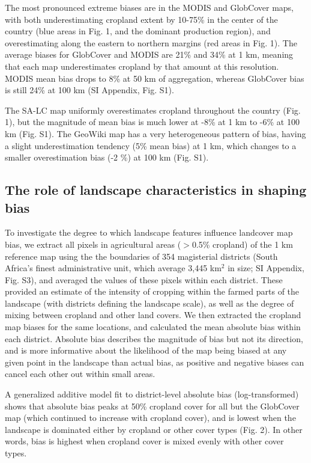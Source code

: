 \documentclass{pnastwo}
\begin{document}
\begin{article}
The most pronounced extreme biases are in the MODIS and GlobCover maps, with both underestimating cropland extent by 10-75\% in the center of the country (blue areas in Fig. 1, and the dominant production region), and overestimating along the eastern to northern margins (red areas in Fig. 1). The average biases for GlobCover and MODIS are 21\% and 34\% at 1 km, meaning that each map underestimates cropland by that amount at this resolution. MODIS mean bias drops to 8\% at 50 km of aggregation, whereas GlobCover bias is still 24\% at 100 km (SI Appendix, Fig. S1). 

The SA-LC map uniformly overestimates cropland throughout the country (Fig. 1), but the magnitude of mean bias is much lower at -8\% at 1 km to -6\% at 100 km  (Fig. S1). The GeoWiki map has a very heterogeneous pattern of bias, having a slight underestimation tendency (5\% mean bias) at 1 km, which changes to a smaller overestimation bias (-2 \%) at 100 km (Fig. S1).    

\subsection{The role of landscape characteristics in shaping bias}
To investigate the degree to which landscape features influence landcover map bias, we extract all pixels in agricultural areas ($>$0.5\% cropland) of the 1 km reference map using the the boundaries of 354 magisterial districts (South Africa's finest administrative unit, which average 3,445 km$^2$ in size; SI Appendix, Fig. S3), and averaged the values of these pixels within each district. These provided an estimate of the intensity of cropping within the farmed parts of the landscape (with districts defining the landscape scale), as well as the degree of mixing between cropland and other land covers. We then extracted the cropland map biases for the same locations, and calculated the mean absolute bias within each district. Absolute bias describes the magnitude of bias but not its direction, and is more informative about the likelihood of the map being biased at any given point in the landscape than actual bias, as positive and negative biases can cancel each other out within small areas. 

A generalized additive model fit to district-level absolute bias (log-transformed) shows that absolute bias peaks at 50\% cropland cover for all but the GlobCover map (which continued to increase with cropland cover), and is lowest when the landscape is dominated either by cropland or other cover types (Fig. 2). In other words, bias is highest when cropland cover is mixed evenly with other cover types. 


\end{article}
\end{document}
